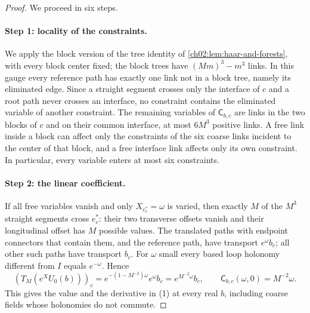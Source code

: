 \begin{proof}
We proceed in six steps.

\paragraph{Step 1: locality of the constraints.}
We apply the block version of the tree identity of \cref{ch02:lem:haar-and-forests}, with every block center fixed; the block trees have $(Mm)^3-m^3$ links. In this gauge every reference path has exactly one link not in a block tree, namely its eliminated edge. Since a straight segment crosses only the interface of $c$ and a root path never crosses an interface, no constraint contains the eliminated variable of another constraint. The remaining variables of $\mathsf C_{b,c}$ are links in the two blocks of $c$ and on their common interface, at most $6M^3$ positive links. A free link inside a block can affect only the constraints of the six coarse links incident to the center of that block, and a free interface link affects only its own constraint. In particular, every variable enters at most six constraints.

\paragraph{Step 2: the linear coefficient.}
If all free variables vanish and only $X_{e^*_c}=\omega$ is varied, then exactly $M$ of the $M^3$ straight segments cross $e^*_c$: their two transverse offsets vanish and their longitudinal offset has $M$ possible values. The translated paths with endpoint connectors that contain them, and the reference path, have transport $e^\omega b_c$; all other such paths have transport $b_c$. For $\omega$ small every based loop holonomy different from $I$ equals $e^{-\omega}$. Hence
\begin{equation}\label{ch03:eq:distinguished-exact}
 (T_M(e^XU_0(b)))_c=e^{-(1-M^{-2})\omega}e^\omega b_c=e^{M^{-2}\omega}b_c,\qquad \mathsf C_{b,c}(\omega,0)=M^{-2}\omega.
\end{equation}
This gives the value and the derivative in (1) at every real $b$, including coarse fields whose holonomies do not commute.


\end{proof}
